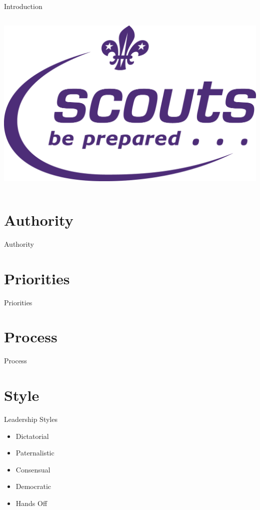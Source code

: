 \documentclass[14pt]{beamer}
\begin{document}
\begin{frame}{Introduction}
\begin{columns}
        \pause
          \includegraphics[scale=0.25]{images/scouts}
      \end{columns}
    \end{frame}


  \section{Authority}

    \begin{frame}{Authority}
    \end{frame}

  \section{Priorities}

    \begin{frame}{Priorities}
      
    \end{frame}

  \section{Process}

    \begin{frame}{Process}
    \end{frame}

  \section{Style}

    \begin{frame}{Leadership Styles}
      \begin{itemize}
        \item Dictatorial
        \item Paternalistic
        \item Consensual
        \item Democratic
        \item Hands Off
      \end{itemize}
    \end{frame}
\end{document}
